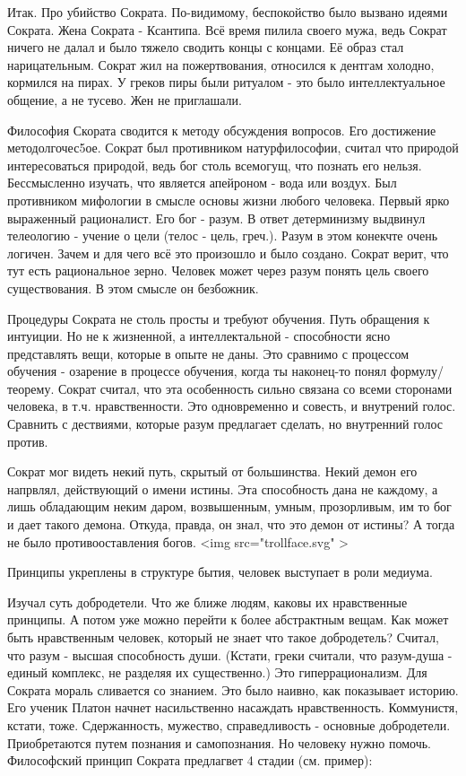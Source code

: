 Итак. Про убийство Сократа. По-видимому, беспокойство было вызвано идеями Сократа.
Жена Сократа - Ксантипа. Всё время пилила своего мужа, ведь Сократ ничего не далал и было тяжело сводить концы с концами. Её образ стал нарицательным. 
Сократ жил на пожертвования, относился к дентгам холодно, кормился на пирах. У греков пиры были ритуалом - это было интеллектуальное общение, а не тусево. Жен не приглашали.

Философия Скората сводится к методу обсуждения вопросов. Его достижение методолгочес5ое. 
Сократ был противником натурфилософии, считал что природой интересоваться природой, ведь бог столь всемогущ, что познать его нельзя. Бессмысленно изучать, что является апейроном - вода или воздух. 
Был противником мифологии в смысле основы жизни любого человека. Первый ярко выраженный рационалист. Его бог - разум. В ответ детерминизму выдвинул телеологию - учение о цели (телос - цель, греч.). 
Разум в этом конекчте очень логичен. Зачем и для чего всё это произошло и было создано. Сократ верит, что тут есть  рациональное зерно. Человек может через разум понять цель своего существования. В этом смысле он безбожник.

Процедуры Сократа не столь просты и требуют обучения. Путь обращения к интуиции. Но не к жизненной, а интеллектальной - способности ясно представлять вещи, которые в опыте не даны. 
Это сравнимо с процессом обучения - озарение в процессе обучения, когда ты наконец-то понял формулу/теорему. Сократ считал, что эта особенность сильно связана со всеми сторонами человека, в т.ч. нравственности. 
Это одновременно и совесть, и внутрений голос. Сравнить с дествиями, которые разум предлагает сделать, но внутренний голос против.

Сократ мог видеть некий путь, скрытый от большинства. Некий демон его напрвлял, действующий о  имени истины. Эта способность дана не каждому, а лишь обладающим неким даром, возвышенным, умным, прозорливым, им то бог и дает такого демона. 
Откуда, правда, он знал, что это демон от истины? А тогда не было противооставления богов. <img src="trollface.svg" >

Принципы укреплены в структуре бытия, человек выступает в роли медиума.

Изучал суть добродетели. Что же ближе людям, каковы их нравственные принципы. А потом уже можно перейти к более абстрактным вещам. 
Как может быть нравственным человек, который не знает что такое добродетель? Считал, что разум - высшая способность души. (Кстати, греки считали, что разум-душа - единый комплекс, не разделяя их существенно.) Это гиперрационализм. 
Для Сократа мораль сливается со знанием. Это было наивно, как показывает историю. Его ученик Платон начнет насильственно насаждать нравственность. Коммунистя, кстати, тоже.
Сдержанность, мужество, справедливость - основные добродетели. Приобретаются путем познания и самопознания. Но человеку нужно помочь.
Философский принцип Сократа предлагвет 4 стадии (см. пример):

